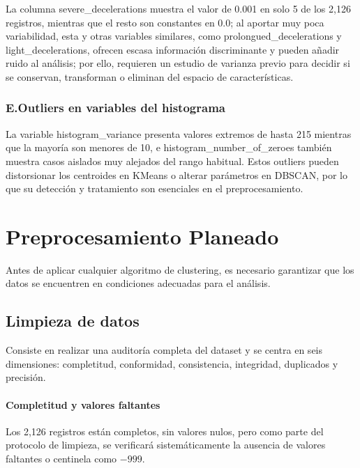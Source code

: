 \documentclass[12pt,letterpaper]{article}
\begin{document}
La columna severe\_decelerations muestra el valor de 0.001 en solo 5 de los 2,126 registros, mientras que el resto son constantes en 0.0; al aportar muy poca variabilidad, esta y otras variables similares, como prolongued\_decelerations y light\_decelerations, ofrecen escasa información discriminante y pueden añadir ruido al análisis; por ello, requieren un estudio de varianza previo para decidir si se conservan, transforman o eliminan del espacio de características.

\subsubsection*{E.\enspace Outliers en variables del histograma}

La variable histogram\_variance presenta valores extremos de hasta 215 mientras que la mayoría son menores de 10, e histogram\_number\_of\_zeroes también muestra casos aislados muy alejados del rango habitual. Estos outliers pueden distorsionar los centroides en K\-Means o alterar parámetros en DBSCAN, por lo que su detección y tratamiento son esenciales en el preprocesamiento.

\section{Preprocesamiento Planeado}

Antes de aplicar cualquier algoritmo de clustering, es necesario garantizar que los datos se
encuentren en condiciones adecuadas para el análisis.

\subsection{Limpieza de datos}

Consiste en realizar una auditoría completa del dataset y se centra en seis dimensiones: completitud, conformidad, consistencia, integridad, duplicados y precisión.

\paragraph{Completitud y valores faltantes}
Los 2,126 registros están completos, sin valores nulos, pero como parte del protocolo de limpieza, se verificará sistemáticamente la ausencia de valores faltantes o centinela como  $−999$.
\end{document}
